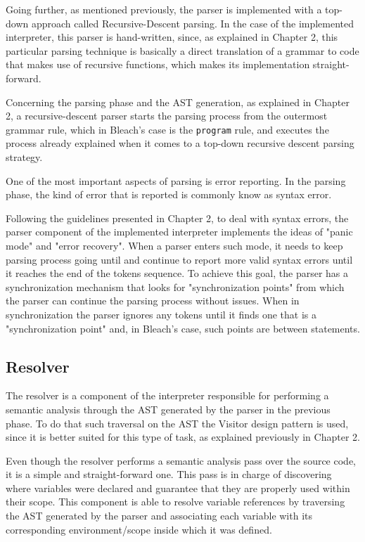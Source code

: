Going further, as mentioned previously, the parser is implemented with a top-down approach called Recursive-Descent parsing. In the case of the implemented interpreter, this parser is hand-written, since, as explained in Chapter 2, this particular parsing technique is basically a direct translation of a grammar to code that makes use of recursive functions, which makes its implementation straight-forward.

Concerning the parsing phase and the AST generation, as explained in Chapter 2, a recursive-descent parser starts the parsing process from the outermost grammar rule, which in Bleach's case is the \texttt{program} rule, and executes the process already explained when it comes to a top-down recursive descent parsing strategy.

One of the most important aspects of parsing is error reporting. In the parsing phase, the kind of error that is reported is commonly know as syntax error.

Following the guidelines presented in Chapter 2, to deal with syntax errors, the parser component of the implemented interpreter implements the ideas of "panic mode" and "error recovery". When a parser enters such mode, it needs to keep parsing process going until and continue to report more valid syntax errors until it reaches the end of the tokens sequence. To achieve this goal, the parser has a synchronization mechanism that looks for "synchronization points" from which the parser can continue the parsing process without issues. When in synchronization the parser ignores any tokens until it finds one that is a "synchronization point" and, in Bleach's case, such points are between statements.

\subsection{Resolver}
The resolver is a component of the interpreter responsible for performing a semantic analysis through the AST generated by the parser in the previous phase. To do that such traversal on the AST the Visitor design pattern is used, since it is better suited for this type of task, as explained previously in Chapter 2. 

Even though the resolver performs a semantic analysis pass over the source code, it is a simple and straight-forward one. This pass is in charge of discovering where variables were declared and guarantee that they are properly used within their scope. This component is able to resolve variable references by traversing the AST generated by the parser and associating each variable with its corresponding environment/scope inside which it was defined.


